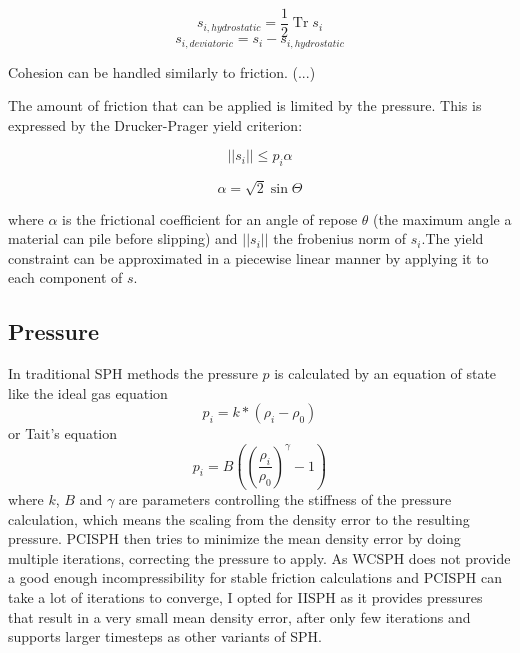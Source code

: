\documentclass[intern]{cgMA}
\DeclareMathOperator{\Tr}{Tr}
\begin{document}
    \begin{equation}
        s_{i, hydrostatic} = \frac{1}{2} \Tr s_i 
    \end{equation}
    \begin{equation}
        s_{i, deviatoric} = s_i - s_{i, hydrostatic} 
    \end{equation}

    Cohesion can be handled similarly to friction. (...)

    The amount of friction that can be applied is limited by the pressure. This is expressed by the Drucker-Prager yield criterion:

    \begin{equation}
        ||s_i|| \leq p_i \alpha
    \end{equation}

    \begin{equation}
        \alpha = \sqrt{2} \sin \Theta
    \end{equation}

    where $\alpha$ is the frictional coefficient for an angle of repose $\theta$ (the maximum angle a material can pile before slipping) and $||s_i||$ the frobenius norm of $s_i$.The yield constraint can be approximated in a piecewise linear manner by applying it to each component of $s$. \cite{10.1145/2019406.2019410} \cite{10.2312:PE:vriphys:vriphys12:053-060} \cite{10.2312:LocalChapterEvents:CEIG:CEIG09:011-018} \cite{10.1145/1866158.1866195}

    \subsection{Pressure} \label{sec:pressure}
    In traditional SPH methods the pressure $p$ is calculated by an equation of state like the ideal gas equation \cite{wcsph}
    \begin{equation}
        p_i = k * (\rho_i - \rho_0)
    \end{equation}
    or Tait's equation \cite{wcsph}
    \begin{equation}
        p_i = B ((\frac{\rho_i}{\rho_0})^{\gamma} - 1)
    \end{equation}
    where $k$, $B$ and $\gamma$ are parameters controlling the stiffness of the pressure calculation, which means the scaling from the density error to the resulting pressure.
    PCISPH then tries to minimize the mean density error by doing multiple iterations, correcting the pressure to apply. As WCSPH does not provide a good enough incompressibility for stable friction calculations and PCISPH can take a lot of iterations to converge, I opted for IISPH as it provides pressures that result in a very small mean density error, after only few iterations and supports larger timesteps as other variants of SPH.
\end{document}
